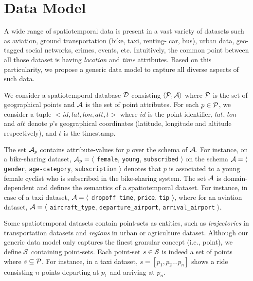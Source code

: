 \section{Data Model}\label{sec:data-model}
A wide range of spatiotemporal data is present in a vast variety of datasets such as aviation, ground transportation (bike, taxi, renting- car, bus), urban data, geo-tagged social networks, crimes, events, etc. Intuitively, the common point between all those dataset is having {\em location} and {\em time} attributes. Based on this particularity, we propose a generic data model to capture all diverse aspects of such data.

We consider a spatiotemporal database ${\cal D}$ consisting $\langle {\cal P}, {\cal A} \rangle$ where ${\cal P}$ is the set of
geographical points and ${\cal A}$ is the set of point attributes. For each $p \in {\cal P}$, we consider a tuple $<id, lat, lon, alt, t>$ where $id$ is the point identifier, $lat$, $lon$ and $alt$ denote $p$'s geographical coordinates (latitude, longitude and altitude respectively), and $t$ is the timestamp.

The set ${\cal A}_p$ contains attribute-values for $p$ over the schema of ${\cal A}$. For instance, on a bike-sharing dataset, ${\cal A}_p = \langle $ {\tt female}, {\tt young}, {\tt subscribed} $\rangle$ on the schema ${\cal A} = \langle$ {\tt gender}, {\tt age-category}, {\tt subscription} $\rangle$ denotes that $p$ is associated to a young female cyclist who is subscribed in the bike-sharing system. The set ${\cal A}$ is domain-dependent and defines the semantics of a spatiotemporal dataset. For instance, in case of a taxi dataset, ${\cal A} = \langle$ {\tt dropoff\_time}, {\tt price}, {\tt tip} $\rangle$, where for an aviation dataset, ${\cal A} = \langle$ {\tt aircraft\_type}, {\tt departure\_airport}, {\tt arrival\_airport} $\rangle$.

Some spatiotemporal datasets contain point-sets as entities, such as {\em trajectories} in transportation datasets and {\em regions} in urban or agriculture dataset. Although our generic data model only captures the finest granular concept (i.e., point), we define ${\cal S}$ containing point-sets. Each point-set $s \in {\cal S}$ is indeed a set of points where $s \subseteq {\cal P}$. For instance, in a taxi dataset, $s = [ p_1, p_2 \dots p_n ]$ shows a ride consisting $n$ points departing at $p_1$ and arriving at $p_n$.